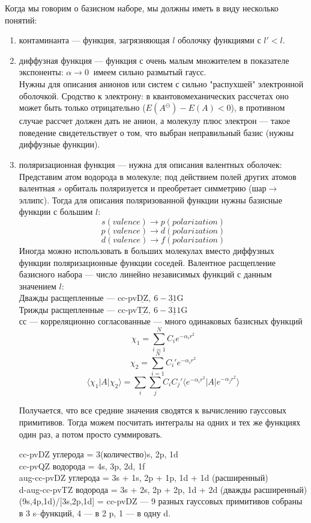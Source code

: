 \documentclass[a4paper,14pt]{extarticle}
\begin{document}
Когда мы говорим о базисном наборе, мы должны иметь в виду несколько понятий:
\begin{enumerate}

\item контаминанта --- функция, загрязняющая $l$ оболочку функциями с $l' < l$.

\item диффузная функция --- функция с очень малым множителем в показателе экспоненты:
$ \alpha \rightarrow 0 \ \text{ имеем сильно размытый гаусс. }$ \\ 
Нужны для описания анионов или систем с сильно "распухшей" электронной оболочкой.
Сродство к электрону:
в квантовомеханических рассчетах оно может быть только отрицательно ($E(A^{\ominus}) - E(A) < 0$),
в противном случае рассчет должен дать не анион, а молекулу плюс электрон --- такое поведение свидетельствует о том, 
что выбран неправильный базис (нужны диффузные функции).

\item поляризационная функция --- нужна для описания валентных оболочек:
Представим атом водорода в молекуле; 
под действием полей других атомов валентная $s$ орбиталь поляризуется и преобретает симметрию (шар$\rightarrow$ эллипс).
Тогда для описания поляризованной функции нужны базисные функции с большим $l$:
$$s (valence) \rightarrow p (polarization)$$
$$p (valence) \rightarrow d (polarization)$$
$$d (valence) \rightarrow f (polarization)$$
Иногда можно использовать в больших молекулах вместо диффузных функции поляризационные функции соседей.
Валентное расщепление базисного набора --- число линейно независимых функций с данным значением $l$:\\
Дважды расщепленные --- cc-pv$\underline{\text{DZ}},\ 6-\underline{31}$G\\
Трижды расщепленные --- cc-pv$\underline{\text{TZ}},\ 6-\underline{311}$G\\
сс --- корреляционно согласованные --- много одинаковых базисных функций
$$\chi_1 = \sum_{i=1} ^ N C_i e^{-\alpha_i r^2}$$
$$\chi_2 = \sum_{i=1} ^ N C_i' e^{-\alpha_i r^2}$$
$$\langle\chi_1|A|\chi_2\rangle = \sum_i\sum_j C_iC_j'\langle e^{-\alpha_i r^2}|A|e^{-\alpha_jr^2}\rangle$$

Получается, что все средние значения сводятся к вычислению гауссовых примитивов. 
Тогда можем посчитать интегралы на одних и тех же функциях один раз, а потом просто суммировать.

cc-pvDZ углерода = 3(количество)s, 2p, 1d\\
cc-pvQZ водорода = 4s, 3p, 2d, 1f\\
aug-cc-pvDZ углерода = 3s + 1s, 2p + 1p, 1d + 1d (расширенный)\\
d-aug-cc-pvTZ водорода = 3s + 2s, 2p + 2p, 1d + 2d (дважды расширенный)\\
(9s,4p,1d)/[3s,2p,1d] = cc-pvDZ --- 9 разных гауссовых примитивов собраны в 3 s--функций, 4 --- в 2 p, 1 --- в одну d.



\end{enumerate}
\end{document}
